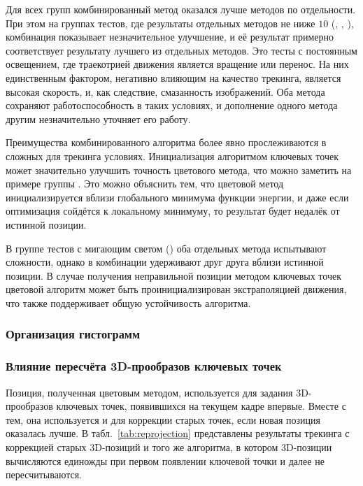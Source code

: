 
Для всех групп комбинированный метод оказался лучше методов по отдельности.
При этом на группах тестов, где результаты отдельных методов не ниже $10$
(, , ), комбинация показывает незначительное улучшение, и её результат
примерно соответствует результату лучшего из отдельных методов.
Это тесты с постоянным освещением, где траекотрией движения является вращение
или перенос.
На них единственным фактором, негативно влияющим на качество трекинга, является
высокая скорость, и, как следствие, смазанность изображений.
Оба метода сохраняют работоспособность в таких условиях, и дополнение одного
метода другим незначительно уточняет его работу.

Преимущества комбинированного алгоритма более явно прослеживаются в сложных для
трекинга условиях.
Инициализация алгоритмом ключевых точек может значительно улучшить точность
цветового метода, что можно заметить на примере группы .
Это можно объяснить тем, что цветовой метод инициализируется вблизи глобального
минимума функции энергии, и даже если оптимизация сойдётся к локальному
минимуму, то результат будет недалёк от истинной позиции.

В группе тестов с мигающим светом () оба отдельных метода
испытывают сложности, однако в комбинации удерживают друг друга вблизи истинной
позиции.
В случае получения неправильной позиции методом ключевых точек цветовой
алгоритм может быть проинициализирован экстраполяцией движения, что также
поддерживает общую устойчивость алгоритма.



\subsubsection{Организация гистограмм}

\subsubsection{Влияние пересчёта 3D-прообразов ключевых точек}

Позиция, полученная цветовым методом, используется для задания 3D-прообразов
ключевых точек, появившихся на текущем кадре впервые.
Вместе с тем, она используется и для коррекции старых точек, если новая позиция
оказалась лучше.
В табл.~\ref{tab:reprojection} представлены результаты трекинга с коррекцией
старых 3D-позиций и того же алгоритма, в котором 3D-позиции вычисляются
единожды при первом появлении ключевой точки и далее не пересчитываются.

